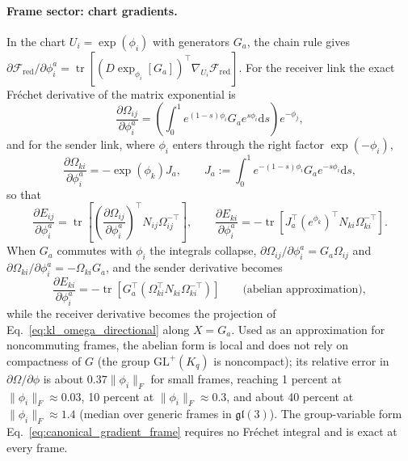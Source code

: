 \documentclass[11pt]{article}
\begin{document}
\paragraph{Frame sector: chart gradients.}
In the chart $U_i = \exp(\phi_i)$ with generators $G_a$, the chain rule gives $\partial\mathcal{F}_{\mathrm{red}}/\partial\phi_i^a = \operatorname{tr}[(D\exp_{\phi_i}[G_a])^\top\nabla_{U_i}\mathcal{F}_{\mathrm{red}}]$. For the receiver link the exact Fr\'echet derivative of the matrix exponential is
\begin{equation}
\frac{\partial \Omega_{ij}}{\partial \phi_i^a} = \left(\int_0^1 e^{(1-s)\phi_i} G_a e^{s\phi_i} \mathrm{d}s\right) e^{-\phi_j},
\label{eq:frechet_dexp}
\end{equation}
and for the sender link, where $\phi_i$ enters through the right factor $\exp(-\phi_i)$,
\begin{equation}
\frac{\partial \Omega_{ki}}{\partial \phi_i^a} = -\exp(\phi_k)J_a,
\qquad
J_a := \int_0^1 e^{-(1-s)\phi_i} G_a e^{-s\phi_i} \mathrm{d}s,
\label{eq:frechet_dexp_sender}
\end{equation}
so that
\begin{equation}
\frac{\partial E_{ij}}{\partial \phi_i^a} = \operatorname{tr}\left[\left(\frac{\partial \Omega_{ij}}{\partial \phi_i^a}\right)^\top N_{ij}\Omega_{ij}^{-\top}\right],
\qquad
\frac{\partial E_{ki}}{\partial \phi_i^a} = -\operatorname{tr}\left[J_a^\top (e^{\phi_k})^\top N_{ki}\Omega_{ki}^{-\top}\right].
\end{equation}
When $G_a$ commutes with $\phi_i$ the integrals collapse, $\partial \Omega_{ij}/\partial \phi_i^a = G_a \Omega_{ij}$ and $\partial \Omega_{ki}/\partial \phi_i^a = -\Omega_{ki} G_a$, and the sender derivative becomes
\begin{equation}
\frac{\partial E_{ki}}{\partial \phi_i^a} = -\operatorname{tr}\left[G_a^\top\left(\Omega_{ki}^\top N_{ki} \Omega_{ki}^{-\top}\right)\right] \qquad \text{(abelian approximation)},
\label{eq:sender_phi_gradient}
\end{equation}
while the receiver derivative becomes the projection of Eq.~\eqref{eq:kl_omega_directional} along $X = G_a$. Used as an approximation for noncommuting frames, the abelian form is local and does not rely on compactness of $G$ (the group $\mathrm{GL}^+(K_q)$ is noncompact); its relative error in $\partial\Omega/\partial\phi$ is about $0.37\|\phi_i\|_F$ for small frames, reaching 1 percent at $\|\phi_i\|_F \approx 0.03$, 10 percent at $\|\phi_i\|_F \approx 0.3$, and about 40 percent at $\|\phi_i\|_F \approx 1.4$ (median over generic frames in $\mathfrak{gl}(3)$). The group-variable form Eq.~\eqref{eq:canonical_gradient_frame} requires no Fr\'echet integral and is exact at every frame.
\end{document}
